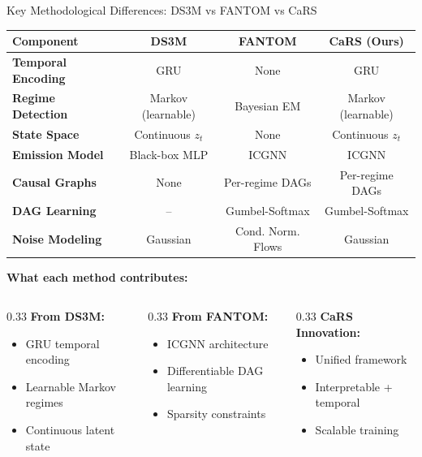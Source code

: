 \documentclass[aspectratio=169]{beamer}
\begin{document}
\begin{frame}{Key Methodological Differences: DS3M vs FANTOM vs CaRS}
\begin{table}
\centering
\small
\begin{tabular}{l|ccc}
\toprule
\textbf{Component} & \textbf{DS3M} & \textbf{FANTOM} & \textbf{CaRS (Ours)} \\
\midrule
\textbf{Temporal Encoding} & GRU & None & GRU \\
\textbf{Regime Detection} & Markov (learnable) & Bayesian EM & Markov (learnable) \\
\textbf{State Space} & Continuous $z_t$ & None & Continuous $z_t$ \\
\textbf{Emission Model} & Black-box MLP & ICGNN & ICGNN \\
\textbf{Causal Graphs} & \textcolor{warnred}{None} & Per-regime DAGs & Per-regime DAGs \\
\textbf{DAG Learning} & -- & Gumbel-Softmax & Gumbel-Softmax \\
\textbf{Noise Modeling} & Gaussian & Cond. Norm. Flows & Gaussian \\
\bottomrule
\end{tabular}
\end{table}

\textbf{What each method contributes:}
\begin{columns}
\begin{column}{0.33\textwidth}
\textcolor{paperblue}{\textbf{From DS3M:}}
\begin{itemize}
    \item GRU temporal encoding
    \item Learnable Markov regimes
    \item Continuous latent state
\end{itemize}
\end{column}

\begin{column}{0.33\textwidth}
\textcolor{paperblue}{\textbf{From FANTOM:}}
\begin{itemize}
    \item ICGNN architecture
    \item Differentiable DAG learning
    \item Sparsity constraints
\end{itemize}
\end{column}

\begin{column}{0.33\textwidth}
\textcolor{reprogreen}{\textbf{CaRS Innovation:}}
\begin{itemize}
    \item Unified framework
    \item Interpretable + temporal
    \item Scalable training
\end{itemize}
\end{column}
\end{columns}
\end{frame}
\end{document}
